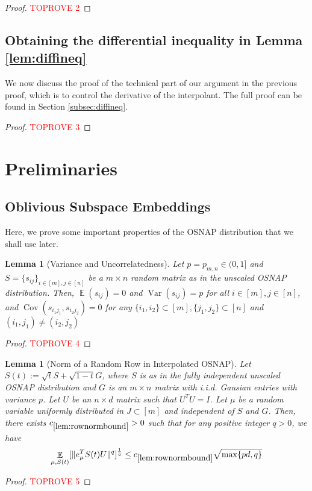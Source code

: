 \documentclass[11pt]{amsart}
\numberwithin{equation}{section}
\numberwithin{equation}{section}
\DeclareMathOperator{\E}{\mathbb{E}}
\DeclareMathOperator{\cov}{Cov}
\DeclarePairedDelimiter{\norm}{\lVert}{\rVert}
\newtheorem{lemma}[theorem]{Lemma}
\theoremstyle{remark}
\theoremstyle{definition}
\begin{document}
\begin{proof}\textcolor{red}{TOPROVE 2}\end{proof}

\subsection{Obtaining the differential inequality in Lemma \ref{lem:diffineq}}

We now discuss the proof of the technical part of our argument in the previous proof, which is to control the derivative of the interpolant. The full proof can be found in Section \ref{subsec:diffineq}.

\begin{proof}\textcolor{red}{TOPROVE 3}\end{proof}

 
\section{Preliminaries} \label{sec:prelim}

\subsection{Oblivious Subspace Embeddings}

Here, we prove some important properties of the OSNAP distribution that we shall use later.

\begin{lemma}[Variance and Uncorrelatedness] \label{lem:osnapvaruncor}
Let $p = p_{m,n} \in (0,1]$ and $S=\{s_{ij}\}_{i \in [m], j \in [n]}$ be a $m \times n$ random matrix as in the unscaled OSNAP distribution. Then, $\E(s_{ij})=0$ and $\operatorname{Var}(s_{ij})=p$ for all $i \in [m], j \in [n]$, and $\cov(s_{i_1 j_1},s_{i_2 j_2})=0$ for any $\{i_1,i_2\} \subset [m], \{j_1,j_2\} \subset [n]$ and $ (i_1,j_1)\neq (i_2,j_2) $
\end{lemma}
\begin{proof}\textcolor{red}{TOPROVE 4}\end{proof}





\begin{lemma}[Norm of a Random Row in Interpolated OSNAP]\label{lem:rownormbound}
    Let $S(t):= \sqrt{t}S + \sqrt{1-t}G$, where $S$ is as in the fully independent unscaled OSNAP distribution and $G$ is an $m \times n$ matrix with i.i.d. Gausian entries with variance $p$. Let $U$ be an $n \times d$ matrix such that $U^TU=I$. Let $\mu$ be a random variable uniformly distributed in $J \subset [m]$ and independent of $S$ and $G$. Then, there exists $c_{\ref*{lem:rownormbound}}> 0$ such that for any positive integer $q>0$, we have
    \begin{align*}
        \E_{\mu, S(t)} [ \norm{e_{\mu}^TS(t)U}^{q} ]^\frac{1}{q} \le c_{\ref*{lem:rownormbound}}\sqrt{\max\{pd,q \}} 
    \end{align*}

\end{lemma}
\begin{proof}\textcolor{red}{TOPROVE 5}\end{proof}
\end{document}
